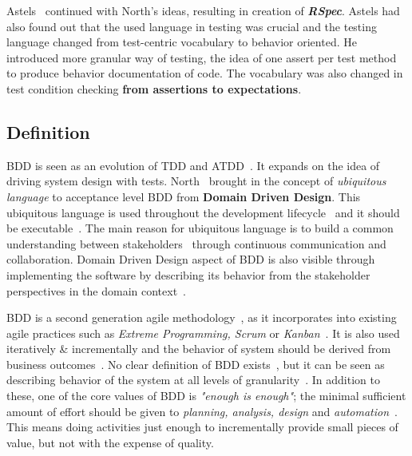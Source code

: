     Astels~\cite{astels2006new} continued with North's ideas, resulting in creation of \textbf{\textit{RSpec}}. Astels had also found
    out that the used language in testing was crucial and the testing language changed from test-centric vocabulary to behavior oriented.
    He introduced more granular way of testing, the idea of one assert per test method to produce behavior documentation of code.
    The vocabulary was also changed in test condition checking \textbf{from assertions to expectations}.

    \subsection{Definition}
    BDD is seen as an evolution of TDD and ATDD~\cite{solis2011study}. It expands on the idea of driving system design with
    tests. North~\cite{bdd2006north} brought in the concept of \textit{ubiquitous language} to acceptance level BDD from \textbf{Domain Driven Design}.
    This ubiquitous language is used throughout the development lifecycle~\cite{solis2011study} and it should be executable~\cite{bdd2006north}.
    The main reason for ubiquitous language is to build a common understanding between stakeholders~\cite{solis2011study} through
    continuous communication and collaboration.
    Domain Driven Design aspect of BDD is also visible through implementing the software by describing its behavior from
    the stakeholder perspectives in the domain context~\cite{chelimsky2010rspec}.

    BDD is a second generation agile methodology~\cite{chelimsky2010rspec}, as it incorporates into existing agile practices such as
    \textit{Extreme Programming, Scrum} or \textit{Kanban}~\cite{smart2014bdd}. It is also used iteratively \& incrementally and the behavior
    of system should be derived from business outcomes~\cite{solis2011study}.
    No clear definition of BDD exists~\cite{okolnychyi2016study}, but it can be seen as describing behavior of the system
    at all levels of granularity~\cite{chelimsky2010rspec}.
    In addition to these, one of the core values of BDD is \textit{"enough is enough"};
    the minimal sufficient amount of effort should be given to \textit{planning, analysis, design} and \textit{automation}~\cite{chelimsky2010rspec}.
    This means doing activities just enough to incrementally provide small pieces of value, but not with the expense of
    quality.

